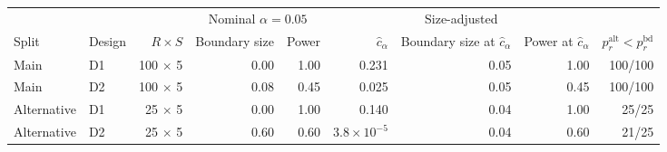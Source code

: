 \begin{tabular}{llrrrrrrr}
\toprule
 & & & \multicolumn{2}{c}{Nominal $\alpha=0.05$} & \multicolumn{3}{c}{Size-adjusted} & \\
\cmidrule(lr){4-5}\cmidrule(lr){6-8}
Split & Design & $R\times S$ & Boundary size & Power & $\hat c_\alpha$ & Boundary size at $\hat c_\alpha$ & Power at $\hat c_\alpha$ & $p^{\mathrm{alt}}_r<p^{\mathrm{bd}}_r$ \\
\midrule
Main & D1 & 100 $\times$ 5 & 0.00 & 1.00 & 0.231 & 0.05 & 1.00 & 100/100 \\
Main & D2 & 100 $\times$ 5 & 0.08 & 0.45 & 0.025 & 0.05 & 0.45 & 100/100 \\
Alternative & D1 & 25 $\times$ 5 & 0.00 & 1.00 & 0.140 & 0.04 & 1.00 & 25/25 \\
Alternative & D2 & 25 $\times$ 5 & 0.60 & 0.60 & $3.8\times10^{-5}$ & 0.04 & 0.60 & 21/25 \\
\bottomrule
\end{tabular}
